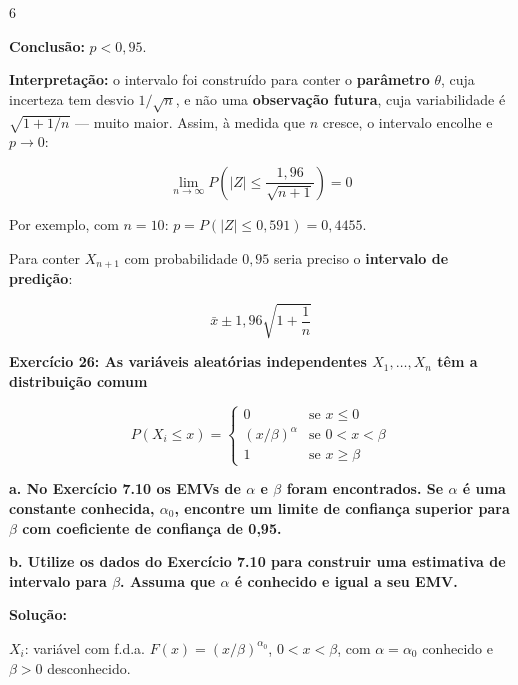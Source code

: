 \documentclass[8pt, a4paper, landscape]{extarticle}
\begin{document}
\begin{multicols}{6}
\vspace{0.2cm}

\textbf{Conclusão:} $p < 0,95$.

\textbf{Interpretação:} o intervalo foi construído para conter o \textbf{parâmetro} $\theta$, cuja incerteza tem desvio $1/\sqrt{n}$, e não uma \textbf{observação futura}, cuja variabilidade é $\sqrt{1 + 1/n}$ — muito maior. Assim, à medida que $n$ cresce, o intervalo encolhe e $p \to 0$:

\begin{equation*}
\lim_{n \to \infty} P\left(|Z| \leq \frac{1,96}{\sqrt{n+1}}\right) = 0
\end{equation*}

Por exemplo, com $n = 10$: $p = P(|Z| \leq 0,591) = 0,4455$.

Para conter $X_{n+1}$ com probabilidade $0,95$ seria preciso o \textbf{intervalo de predição}:

\begin{equation*}
\bar{x} \pm 1,96\sqrt{1 + \frac{1}{n}}
\end{equation*}

\textbf{Exercício 26: As variáveis aleatórias independentes $X_1,\dots,X_n$ têm a distribuição comum}

\begin{equation*}
P(X_i \leq x) =
\begin{cases}
0 & \text{se } x \leq 0 \\
(x/\beta)^\alpha & \text{se } 0 < x < \beta \\
1 & \text{se } x \geq \beta
\end{cases}
\end{equation*}

\textbf{a. No Exercício 7.10 os EMVs de $\alpha$ e $\beta$ foram encontrados. Se $\alpha$ é uma constante conhecida, $\alpha_0$, encontre um limite de confiança superior para $\beta$ com coeficiente de confiança de 0,95.}

\textbf{b. Utilize os dados do Exercício 7.10 para construir uma estimativa de intervalo para $\beta$. Assuma que $\alpha$ é conhecido e igual a seu EMV.}

\vspace{0.3cm}

\textbf{Solução:}

$X_i$: variável com f.d.a. $F(x) = (x/\beta)^{\alpha_0}$, $0 < x < \beta$, com $\alpha = \alpha_0$ conhecido e $\beta > 0$ desconhecido.


\end{multicols}
\end{document}
